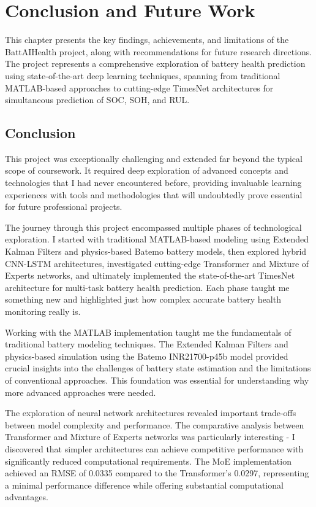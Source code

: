 \chapter{Conclusion and Future Work}
\label{sec:conclusion_future_work}

This chapter presents the key findings, achievements, and limitations of the BattAIHealth project, along with recommendations for future research directions. The project represents a comprehensive exploration of battery health prediction using state-of-the-art deep learning techniques, spanning from traditional MATLAB-based approaches to cutting-edge TimesNet architectures for simultaneous prediction of SOC, SOH, and RUL.

\section{Conclusion}
\label{sec:conclusion}

This project was exceptionally challenging and extended far beyond the typical scope of coursework. It required deep exploration of advanced concepts and technologies that I had never encountered before, providing invaluable learning experiences with tools and methodologies that will undoubtedly prove essential for future professional projects.

The journey through this project encompassed multiple phases of technological exploration. I started with traditional MATLAB-based modeling using Extended Kalman Filters and physics-based Batemo battery models, then explored hybrid CNN-LSTM architectures, investigated cutting-edge Transformer and Mixture of Experts networks, and ultimately implemented the state-of-the-art TimesNet architecture for multi-task battery health prediction. Each phase taught me something new and highlighted just how complex accurate battery health monitoring really is.

Working with the MATLAB implementation taught me the fundamentals of traditional battery modeling techniques. The Extended Kalman Filters and physics-based simulation using the Batemo INR21700-p45b model provided crucial insights into the challenges of battery state estimation and the limitations of conventional approaches. This foundation was essential for understanding why more advanced approaches were needed.

The exploration of neural network architectures revealed important trade-offs between model complexity and performance. The comparative analysis between Transformer and Mixture of Experts networks was particularly interesting - I discovered that simpler architectures can achieve competitive performance with significantly reduced computational requirements. The MoE implementation achieved an RMSE of 0.0335 compared to the Transformer's 0.0297, representing a minimal performance difference while offering substantial computational advantages.

